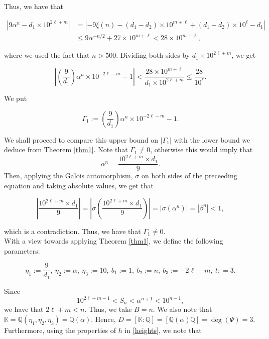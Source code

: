 \documentclass[10pt,a4paper]{article}
\begin{document}
\noindent Thus, we have that

\begin{align*}
|9 \alpha^n  - d_1 \times 10^{2\ell + m}| & = |-9\xi(n) - (d_1-d_2)\times 10^{m+\ell} + (d_1-d_2)\times 10^\ell - d_1| \\
& \leq 9 \alpha^{-n/2} + 27 \times 10^{m + \ell}  < 28 \times 10^{m + \ell},
\end{align*}

\noindent where we used the fact that $n > 500$. Dividing both sides by $d_1 \times 10^{2\ell + m}$, we get

\begin{equation}\label{eq4}
\left | \left( \frac{9}{d_1} \right) \alpha^n \times 10^{-2\ell -m} - 1  \right | < \frac{28 \times 10^{m+\ell}}{d_1 \times 10^{2\ell +m}} \le  \frac{28}{10^\ell}.
\end{equation}

\noindent We put

\begin{equation}
\Gamma_1 := \left( \frac{9}{d_1} \right) \alpha^n \times 10^{-2\ell -m} - 1 .
\end{equation}

\noindent We shall proceed to compare this upper bound on $|\Gamma_1|$ with the lower bound we deduce from Theorem \ref{thm1}. Note that $\Gamma_1 \neq 0$, otherwise this would imply that $$ \alpha^n = \frac{10^{2\ell + m} \times d_1}{9}.$$ Then,  applying the Galois automorphism, $\sigma$ on both sides of the preceeding equation and taking absolute values, we get that

\begin{equation*}
\left| \frac{10^{2\ell + m} \times d_1}{9} \right| =\left|\sigma\left( \frac{10^{2\ell + m} \times d_1}{9}\right) \right|= |\sigma ( \alpha^n)| = |\beta^n| < 1,
\end{equation*}

\noindent which is a contradiction. Thus, we have that $\Gamma_1 \neq 0$.\\

\noindent With a view towards applying Theorem \ref{thm1}, we define the following parameters:

\begin{equation*}
\eta_1 := \frac{9}{d_1}, \ \eta_2 := \alpha, \ \eta_3 := 10, \ b_1 := 1, \ b_2 := n, \ b_3 := -2\ell - m, \ t: = 3.
\end{equation*}

\noindent Since $$10^{2\ell +m -1} < S_n <  \alpha^{n+1}<10^{n-1},$$ we have that $2\ell + m < n$. Thus, we take $B = n$. We also note that $\mathbb{K} = \mathbb{Q}(\eta_1, \eta_2, \eta_3) = \mathbb{Q}(\alpha)$. Hence, $D = [\mathbb{K}: \mathbb{Q}] =  [\mathbb{Q}(\alpha) \mathbb{Q}] = \deg (\Psi) = 3$.
\noindent Furthermore, using the properties of $ h $ in \eqref{heights},  we note that
\end{document}
